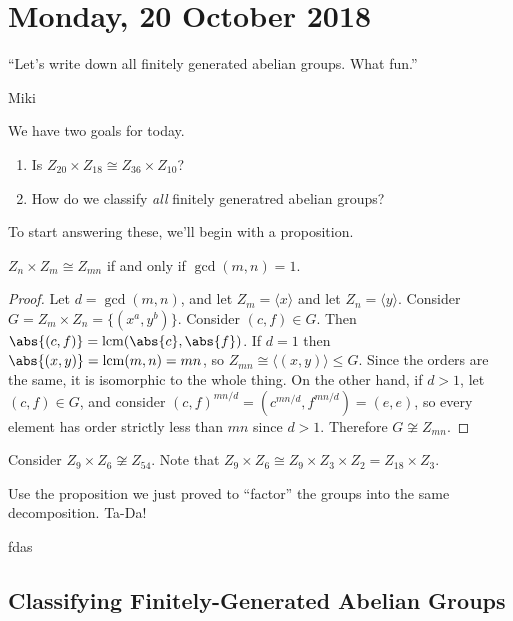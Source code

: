 \section{Monday, 20 October 2018}

\epigraph{``Let's write down all finitely generated abelian groups. What fun.''}{Miki}

We have two goals for today.
\begin{enumerate}
\item Is $Z_{20} \times Z_{18} \cong Z_{36} \times Z_{10}$?
\item How do we classify \emph{all} finitely generatred abelian groups?
\end{enumerate}

To start answering these, we'll begin with a proposition.

\begin{proposition}
$Z_n \times Z_m \cong Z_{mn}$ if and only if $\gcd(m,n) = 1$.
\end{proposition}

\begin{proof}
Let $d = \gcd(m,n)$, and let $Z_m = \langle x \rangle$ and let $Z_n = \langle y \rangle$. Consider $G = Z_m \times Z_n = \{(x^a, y^b)\}$. Consider $(c,f) \in G$. Then $\abs{(c,f)} = \lcm (\abs{c}, \abs{f})$. If $d = 1$ then $\abs{(x,y)} = \lcm (m,n) = mn$, so $Z_{mn} \cong \langle (x,y) \rangle \leq G$. Since the orders are the same, it is isomorphic to the whole thing.
On the other hand, if $d > 1$, let $(c,f) \in G$, and consider $(c,f)^{mn/d} = (c^{mn/d}, f^{mn/d}) = (e,e)$, so every element has order strictly less than $mn$ since $d > 1$. Therefore $G \not\cong Z_{mn}$.
\end{proof}

\begin{example}
Consider $Z_9 \times Z_6 \not\cong Z_{54}$. Note that $Z_9 \times Z_6 \cong Z_9 \times Z_3 \times Z_2 = Z_{18} \times Z_3$.
\end{example}

\begin{example}
Use the proposition we just proved to ``factor'' the groups into the same decomposition. Ta-Da!
\end{example}

fdas

\subsection{Classifying Finitely-Generated Abelian Groups}

